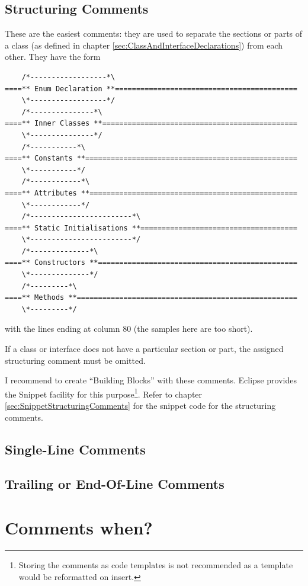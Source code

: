 \documentclass[12pt,a4paper,titlepage, parskip=half, headsepline, footsepline, cleardoubleplain]{scrbook}
\begin{document}
\subsection{Structuring Comments}\label{sec:StructuringComments}
These are the easiest comments: they are used to separate the sections or parts of a class (as defined in chapter \vref{sec:ClassAndInterfaceDeclarations}) from each other. They have the form
\begin{lstlisting}
    /*------------------*\
====** Enum Declaration **===========================================
    \*------------------*/
    /*---------------*\
====** Inner Classes **==============================================
    \*---------------*/
    /*-----------*\
====** Constants **==================================================
    \*-----------*/
    /*------------*\
====** Attributes **=================================================
    \*------------*/
    /*------------------------*\
====** Static Initialisations **=====================================
    \*------------------------*/
    /*--------------*\
====** Constructors **===============================================
    \*--------------*/
    /*---------*\
====** Methods **====================================================
    \*---------*/
\end{lstlisting}

with the lines ending at column 80 (the samples here are too short).

If a class or interface does not have a particular section or part, the assigned structuring comment must be omitted.

I recommend to create “Building Blocks” with these comments. Eclipse provides the Snippet facility for this purpose\footnote{Storing the comments as code templates is not recommended as a template would be reformatted on insert.}. Refer to chapter \vref{sec:SnippetStructuringComments} for the snippet code for the structuring comments.

\subsection{Single-Line Comments}\label{sec:SingleLineComments}

\subsection{Trailing or End-Of-Line Comments}\label{sec:TrailingOrEndOfLineComments}

\section{Comments when?}\label{sec:CommentsWhen}
\end{document}
